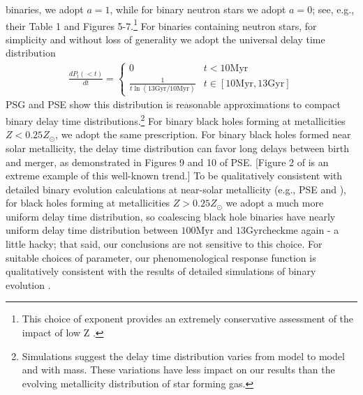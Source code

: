\documentclass[nofootinbib,twocolumn,prd]{emulateapj}
\newcommand\editremark[1]{{\color{red}#1}}
\newcommand\unit[1]{\text{#1}}
\newcommand\abbrvPSgrb{PSG}
\newcommand\abbrvPSellipticals{PSE}
\begin{document}
binaries, we adopt $a=1$, while for binary neutron stars we adopt $a=0$; see, e.g., their Table 1 and Figures
5-7.\footnote{This choice of exponent provides an extremely conservative assessment of the impact of low Z
\cite[see,e.g.][]{2012CQGra..29n5011O,gwastro-EventPopsynPaper-2016}. } 
%
For binaries containing neutron stars, for simplicity and without loss of generality we adopt the universal delay time distribution
\begin{eqnarray}
\frac{dP_t(<t)}{dt} =  \begin{cases}
0 & t<10 \unit{Myr} \\
\frac{1}{t \ln (13 \unit{Gyr}/10\unit{Myr})} & t \in [10\unit{Myr},13\unit{Gyr}]
\end{cases} 
\end{eqnarray}
\abbrvPSgrb{} and \abbrvPSellipticals{} show this distribution is reasonable approximations to compact binary delay
time distributions.\footnote{Simulations suggest the delay time distribution varies from model to model and with mass.
  These variations have less impact on our results than the evolving metallicity distribution of star forming gas.}
%
For binary black holes forming at metallicities $Z<0.25 Z_\odot$, we adopt the same prescription.  
For binary black holes formed near solar metallicity, the delay time distribution can favor long delays between birth
and merger, as demonstrated in Figures 9 and 10 of \abbrvPSellipticals{}.  [Figure 2 of  \cite{2016arXiv160508783L} is
  an extreme example of this well-known trend.] 
To be qualitatively consistent with detailed binary evolution calculations at near-solar metallicity (e.g., \abbrvPSellipticals{} and
\cite{gwastro-EventPopsynPaper-2016}), for 
black holes forming at metallicities $Z>0.25 Z_\odot$ we adopt a much more uniform delay time distribution, so 
coalescing black hole binaries have nearly uniform delay time distribution between $100\unit{Myr}$ and
$13\unit{Gyr}$\editremark{checkme again - a little hacky}; that said,  our conclusions are not sensitive to this choice.
%
For suitable choices of parameter, our phenomenological response function is qualitatively consistent with the results of detailed simulations of binary
evolution  \citep{2010ApJ...715L.138B,popsyn-LowMetallicityImpact2c-StarTrackRevised-2014,popsyn-LowMetallicityImpact2b-StarTrackRevised-2013,popsyn-LowMetallicityImpact2-StarTrackRevised-2012}.
\end{document}
